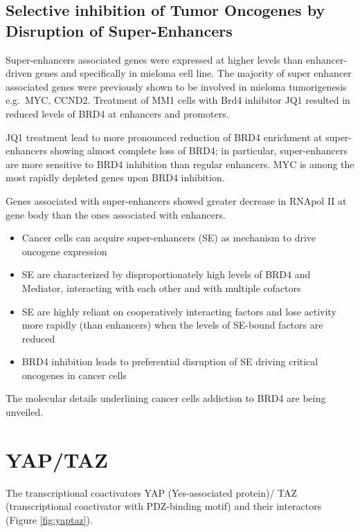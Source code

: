 \hypertarget{selective-inhibition-of-tumor-oncogenes-by-disruption-of-super-enhancers}{%
\subsection{Selective inhibition of Tumor Oncogenes by Disruption of Super-Enhancers}\label{selective-inhibition-of-tumor-oncogenes-by-disruption-of-super-enhancers}}

Super-enhancers associated genes were expressed at higher levels than enhancer-driven genes and specifically in mieloma cell line. The majority of super enhancer associated genes were previously shown to be involved in mieloma tumorigenesis e.g.~MYC, CCND2. Treatment of MM1 cells with Brd4 inhibitor JQ1 resulted in reduced levels of BRD4 at enhancers and promoters.

JQ1 treatment lead to more pronounced reduction of BRD4 enrichment at super- enhancers showing almost complete loss of BRD4; in particular, super-enhancers are more sensitive to BRD4 inhibition than regular enhancers. MYC is among the most rapidly depleted genes upon BRD4 inhibition.

Genes associated with super-enhancers showed greater decrease in RNApol II at gene body than the ones associated with enhancers.

\begin{itemize}
\tightlist
\item
  Cancer cells can acquire super-enhancers (SE) as mechanism to drive oncogene expression
\item
  SE are characterized by disproportionately high levels of BRD4 and Mediator, interacting with each other and with multiple cofactors
\item
  SE are highly reliant on cooperatively interacting factors and lose activity more rapidly (than enhancers) when the levels of SE-bound factors are reduced
\item
  BRD4 inhibition leads to preferential disruption of SE driving critical oncogenes in cancer cells
\end{itemize}

The molecular details underlining cancer cells addiction to BRD4 are being unveiled.

\hypertarget{yaptaz}{%
\section{YAP/TAZ}\label{yaptaz}}

The transcriptional coactivators YAP (Yes-associated protein)/ TAZ (transcriptional coactivator with PDZ-binding motif) and their interactors (Figure \ref{fig:yaptaz}).

